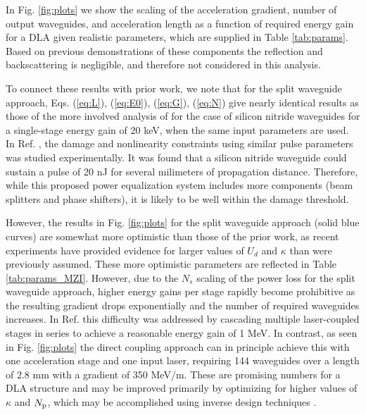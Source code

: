 In Fig. \ref{fig:plots} we show the scaling of the acceleration gradient, number of output waveguides, and acceleration length as a function of required energy gain for a DLA given realistic parameters, which are supplied in Table \ref{tab:params}.  Based on previous demonstrations of these components \cite{Annoni2017, shen2017deep} the reflection and backscattering is negligible, and therefore not considered in this analysis.

To connect these results with prior work, we note that for the split waveguide approach, Eqs. (\ref{eq:L}), (\ref{eq:E0}), (\ref{eq:G}), (\ref{eq:N}) give nearly identical results as those of the more involved analysis of \cite{hughes_-chip_2018} for the case of silicon nitride waveguides for a single-stage energy gain of 20 keV, when the same input parameters are used. 
In Ref. \cite{tan2019silicon}, the damage and nonlinearity constraints using similar pulse parameters was studied experimentally. It was found that a silicon nitride waveguide could sustain a pulse of 20 nJ for several milimeters of propagation distance.  Therefore, while this proposed power equalization system includes more components (beam splitters and phase shifters), it is likely to be well within the damage threshold.

However, the results in Fig. \ref{fig:plots} for the split waveguide approach (solid blue curves) are somewhat more optimistic than those of the prior work, as recent experiments \cite{tan2019silicon, bar2019design} have provided evidence for larger values of $U_d$ and $\kappa$ than were previously assumed. These more optimistic parameters are reflected in Table \ref{tab:params_MZI}. However, due to the $N_s$ scaling of the power loss for the split waveguide approach, higher energy gains per stage rapidly become prohibitive as the resulting gradient drops exponentially and the number of required waveguides increases. In Ref. \cite {hughes_-chip_2018} this difficulty was addressed by cascading multiple laser-coupled stages in series to achieve a reasonable energy gain of 1 MeV.  In contrast, as seen in Fig. \ref{fig:plots} the direct coupling approach can in principle achieve this with one acceleration stage and one input laser, requiring 144 waveguides over a length of 2.8 mm with a gradient of 350 MeV/m. These are promising numbers for a DLA structure and may be improved primarily by optimizing for higher values of $\kappa$ and $N_\textrm{p}$, which may be accomplished using inverse design techniques \cite{hughes_method_2017}.

